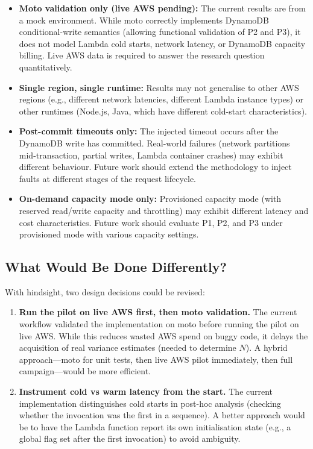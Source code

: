 \begin{itemize}
    \item \textbf{Moto validation only (live AWS pending):} The current results are from a mock environment. While moto correctly implements DynamoDB conditional-write semantics (allowing functional validation of P2 and P3), it does not model Lambda cold starts, network latency, or DynamoDB capacity billing. Live AWS data is required to answer the research question quantitatively.
    
    \item \textbf{Single region, single runtime:} Results may not generalise to other AWS regions (e.g., different network latencies, different Lambda instance types) or other runtimes (Node.js, Java, which have different cold-start characteristics).
    
    \item \textbf{Post-commit timeouts only:} The injected timeout occurs after the DynamoDB write has committed. Real-world failures (network partitions mid-transaction, partial writes, Lambda container crashes) may exhibit different behaviour. Future work should extend the methodology to inject faults at different stages of the request lifecycle.
    
    \item \textbf{On-demand capacity mode only:} Provisioned capacity mode (with reserved read/write capacity and throttling) may exhibit different latency and cost characteristics. Future work should evaluate P1, P2, and P3 under provisioned mode with various capacity settings.
\end{itemize}

\subsection{What Would Be Done Differently?}

With hindsight, two design decisions could be revised:

\begin{enumerate}
    \item \textbf{Run the pilot on live AWS first, then moto validation.} The current workflow validated the implementation on moto before running the pilot on live AWS. While this reduces wasted AWS spend on buggy code, it delays the acquisition of real variance estimates (needed to determine $N$). A hybrid approach---moto for unit tests, then live AWS pilot immediately, then full campaign---would be more efficient.
    
    \item \textbf{Instrument cold vs warm latency from the start.} The current implementation distinguishes cold starts in post-hoc analysis (checking whether the invocation was the first in a sequence). A better approach would be to have the Lambda function report its own initialisation state (e.g., a global flag set after the first invocation) to avoid ambiguity.
\end{enumerate}

